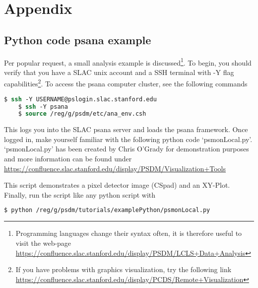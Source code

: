 \chapter{Appendix}
%
%
%
\section{Python code psana example}\label{sec:python-example}
Per popular request, a small analysis example is discussed\footnote{Programming languages change their syntax often, it is therefore useful to visit the web-page\\ \url{https://confluence.slac.stanford.edu/display/PSDM/LCLS+Data+Analysis}}. To begin, you should verify that you have a SLAC unix account and a SSH terminal with -Y flag capabilities\footnote{If you have problems with graphics visualization, try the following link\\ \url{https://confluence.slac.stanford.edu/display/PCDS/Remote+Visualization}}. To access the psana computer cluster, see the following commands
\begin{lstlisting}[language=csh,basicstyle=\footnotesize]
	$ ssh -Y USERNAME@pslogin.slac.stanford.edu
	$ ssh -Y psana
	$ source /reg/g/psdm/etc/ana_env.csh
\end{lstlisting}
This logs you into the SLAC psana server and loads the psana framework. Once logged in, make yourself familiar with the following python code ‘psmonLocal.py’. ‘psmonLocal.py’ has been created by Chris O'Grady for demonstration purposes and more information can be found under\\
\url{https://confluence.slac.stanford.edu/display/PSDM/Visualization+Tools}

This script demonstrates a pixel detector image (CSpad) and an XY-Plot. Finally, run the script like any python script with
\begin{lstlisting}[language=csh]
	$ python /reg/g/psdm/tutorials/examplePython/psmonLocal.py
\end{lstlisting}
